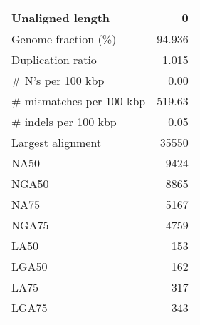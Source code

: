 \documentclass[12pt,a4paper]{article}
\begin{document}
\begin{table}[ht]
\begin{center}
\begin{tabular}{|l*{1}{|r}|}
Unaligned length & 0 \\ \hline
Genome fraction (\%) & 94.936 \\ \hline
Duplication ratio & 1.015 \\ \hline
\# N's per 100 kbp & 0.00 \\ \hline
\# mismatches per 100 kbp & 519.63 \\ \hline
\# indels per 100 kbp & 0.05 \\ \hline
Largest alignment & 35550 \\ \hline
NA50 & 9424 \\ \hline
NGA50 & 8865 \\ \hline
NA75 & 5167 \\ \hline
NGA75 & 4759 \\ \hline
LA50 & 153 \\ \hline
LGA50 & 162 \\ \hline
LA75 & 317 \\ \hline
LGA75 & 343 \\ \hline
\end{tabular}
\end{center}
\end{table}
\end{document}
